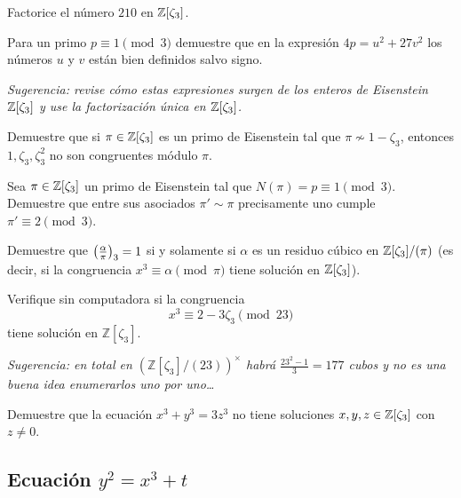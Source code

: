 \begin{ejercicio}
  Factorice el número $210$ en $\mathbb{Z} [\zeta_3]$.
\end{ejercicio}

\begin{ejercicio}
  Para un primo $p\equiv 1\pmod{3}$ demuestre que en la expresión
  $4p = u^2 + 27v^2$ los números $u$ y $v$ están bien definidos salvo
  signo.

  \emph{Sugerencia: revise cómo estas expresiones surgen de los enteros de
    Eisenstein $\mathbb{Z} [\zeta_3]$ y use la factorización única en $\mathbb{Z} [\zeta_3]$.}
\end{ejercicio}

\begin{ejercicio}
  Demuestre que si $\pi\in\mathbb{Z}[\zeta_3]$ es un primo de Eisenstein tal que
  $\pi\not\sim 1-\zeta_3$, entonces $1,\zeta_3,\zeta_3^2$ no son congruentes
  módulo $\pi$.
\end{ejercicio}

\begin{ejercicio}
  Sea $\pi \in \mathbb{Z} [\zeta_3]$ un primo de Eisenstein tal que
  $N (\pi) = p \equiv 1 \pmod{3}$. Demuestre que entre sus asociados
  $\pi' \sim \pi$ precisamente uno cumple $\pi' \equiv 2 \pmod{3}$.
\end{ejercicio}

\begin{ejercicio}
  Demuestre que $\left(\frac{\alpha}{\pi}\right)_3 = 1$ si y solamente si $\alpha$ es un
  residuo cúbico en $\mathbb{Z} [\zeta_3]/(\pi)$ (es decir, si la congruencia
  $x^3 \equiv \alpha \pmod{\pi}$ tiene solución en $\mathbb{Z} [\zeta_3]$).
\end{ejercicio}

\begin{ejercicio}
  Verifique sin computadora si la congruencia
  $$x^3 \equiv 2 - 3\zeta_3 \pmod{23}$$
  tiene solución en $\mathbb{Z} [\zeta_3]$.

  \emph{Sugerencia: en total en $(\mathbb{Z} [\zeta_3]/(23))^\times$ habrá
    $\frac{23^2 - 1}{3} = 177$ cubos y no es una buena idea enumerarlos uno por
    uno\dots}
\end{ejercicio}

\begin{ejercicio}
  Demuestre que la ecuación $x^3 + y^3 = 3z^3$ no tiene soluciones
  $x,y,z \in \mathbb{Z} [\zeta_3]$ con $z\ne 0$.
\end{ejercicio}

\subsection*{Ecuación $y^2 = x^3 + t$}

